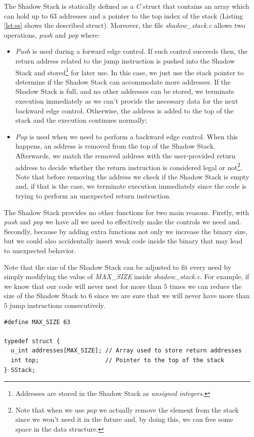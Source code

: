 The Shadow Stack is statically defined as a \textit{C} struct that contains an array
which can hold up to $63$ addresses and a pointer to the top index of the stack (Listing
\ref{lst:ss} shows the described struct). Moreover, the file \textit{shadow\_stack.c}
allows two operations, \textit{push} and \textit{pop} where:
\begin{itemize}
  \item \textit{Push} is used during a forward edge control. If such control succeeds
    then, the return address related to the jump instruction is pushed into the
    Shadow Stack and stored\footnote{Addresses are stored in the Shadow Stack as
    \textit{unsigned integers}.} for later use. In this case, we just use the stack
    pointer to determine if the Shadow Stack can accommodate more addresses. If
    the Shadow Stack is full, and no other addresses can be stored, we terminate
    execution immediately as we can't provide the necessary data for the next
    backward edge control. Otherwise, the address is added to the top of the
    stack and the execution continues normally;

  \item \textit{Pop} is used when we need to perform a backward edge control. When
    this happens, an address is removed from the top of the Shadow Stack. Afterwards,
    we match the removed address with the user-provided return address to decide
    whether the return instruction is considered legal or not\footnote{Note that
    when we use \textit{pop} we actually remove the element from the stack since
    we won't need it in the future and, by doing this, we can free some space in
    the data structure.}. Note that before removing the address we check if the
    Shadow Stack is empty and, if that is the case, we terminate execution
    immediately since the code is trying to perform an unexpected return
    instruction.
\end{itemize}

The Shadow Stack provides no other functions for two main reasons. Firstly, with
\textit{push} and \textit{pop} we have all we need to effectively make the controls
we need and. Secondly, because by adding extra functions not only we increase the
binary size, but we could also accidentally insert weak code inside the binary
that may lead to unexpected behavior.

Note that the size of the Shadow Stack can be adjusted to fit every need by
simply modifying the value of \textit{MAX\_SIZE} inside \textit{shadow\_stack.c}.
For example, if we know that our code will never nest for more than $5$ times we
can reduce the size of the Shadow Stack to $6$ since we are sure that we will
never have more than $5$ jump instructions consecutively. \\ \begin{lstlisting}[style=CStyle, caption = Shadow Stack definition inside \textit{shadow\_stack.c}, label={lst:ss}]
#define MAX_SIZE 63

typedef struct {
  u_int addresses[MAX_SIZE]; // Array used to store return addresses
  int top;                   // Pointer to the top of the stack
} SStack;
\end{lstlisting}

